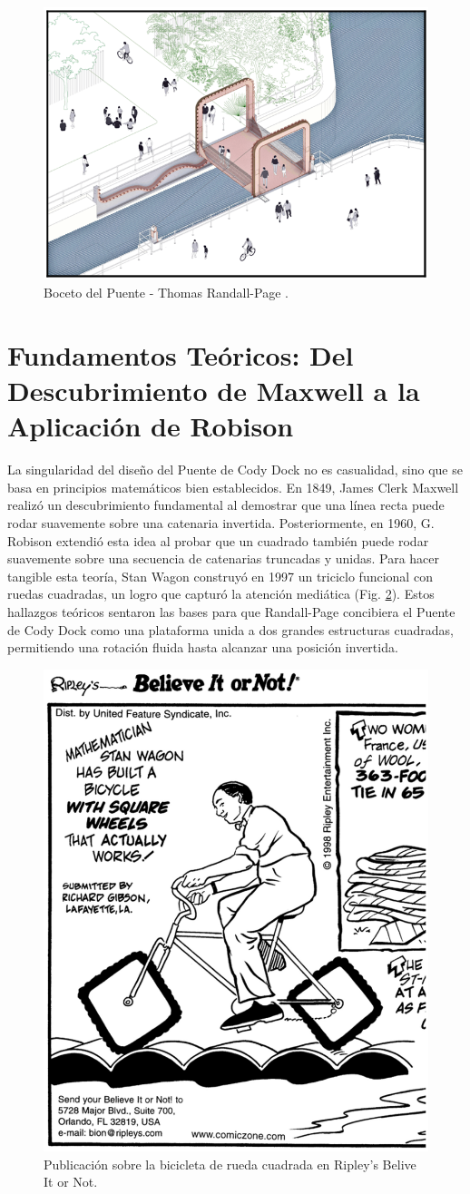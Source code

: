 \documentclass{IEEEtran}
\begin{document}
\begin{figure}[h]
    \centering
    \includegraphics[width = 0.5 \textwidth]{Imagenes/Cody Dock Sketch.png}
    \caption{Boceto del Puente - Thomas Randall-Page \cite{randallpage2021}.}
    \label{fig: Dibujo de Cody Dock}
\end{figure}

\section{Fundamentos Teóricos: Del Descubrimiento de Maxwell a la Aplicación de Robison}

La singularidad del diseño del Puente de Cody Dock no es casualidad, sino que se basa en principios matemáticos bien establecidos. En 1849, James Clerk Maxwell realizó un descubrimiento fundamental al demostrar que una línea recta puede rodar suavemente sobre una catenaria invertida. Posteriormente, en 1960, G. Robison extendió esta idea al probar que un cuadrado también puede rodar suavemente sobre una secuencia de catenarias truncadas y unidas. Para hacer tangible esta teoría, Stan Wagon construyó en 1997 un triciclo funcional con ruedas cuadradas, un logro que capturó la atención mediática (Fig. \ref{fig: Ripley's Belive It or Not}). Estos hallazgos teóricos sentaron las bases para que Randall-Page concibiera el Puente de Cody Dock como una plataforma unida a dos grandes estructuras cuadradas, permitiendo una rotación fluida hasta alcanzar una posición invertida.

\begin{figure}[h]
    \centering
    \includegraphics[width = 0.5 \textwidth]{Imagenes/Square Wheel Tricycle.png}
    \caption{Publicación sobre la bicicleta de rueda cuadrada en Ripley's Belive It or Not.}
    \label{fig: Ripley's Belive It or Not}
\end{figure}
\end{document}
